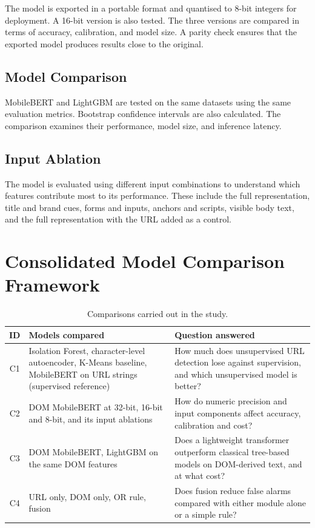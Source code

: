 \documentclass{FastFyp}
\begin{document}
The model is exported in a portable format and quantised to 8-bit integers for deployment. A 16-bit version is also tested. The three versions are compared in terms of accuracy, calibration, and model size. A parity check ensures that the exported model produces results close to the original.

\subsection{Model Comparison}

MobileBERT and LightGBM are tested on the same datasets using the same evaluation metrics. Bootstrap confidence intervals are also calculated. The comparison examines their performance, model size, and inference latency.

\subsection{Input Ablation}

The model is evaluated using different input combinations to understand which features contribute most to its performance. These include the full representation, title and brand cues, forms and inputs, anchors and scripts, visible body text, and the full representation with the URL added as a control.

\section{Consolidated Model Comparison Framework}
\label{sec:comparison}

\begin{table}[!ht]
\centering
\caption{Comparisons carried out in the study.}
\label{tab:comparisons}
\begin{tabularx}{\textwidth}{|c|>{\raggedright\arraybackslash}X|>{\raggedright\arraybackslash}X|}
\hline
\textbf{ID} & \textbf{Models compared} & \textbf{Question answered} \\
\hline
C1 & Isolation Forest, character-level autoencoder, K-Means baseline, MobileBERT on URL strings (supervised reference) & How much does unsupervised URL detection lose against supervision, and which unsupervised model is better? \\
\hline
C2 & DOM MobileBERT at 32-bit, 16-bit and 8-bit, and its input ablations & How do numeric precision and input components affect accuracy, calibration and cost? \\
\hline
C3 & DOM MobileBERT, LightGBM on the same DOM features & Does a lightweight transformer outperform classical tree-based models on DOM-derived text, and at what cost? \\
\hline
C4 & URL only, DOM only, OR rule, fusion & Does fusion reduce false alarms compared with either module alone or a simple rule? \\
\hline
\end{tabularx}
\end{table}
\end{document}
